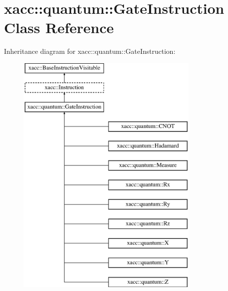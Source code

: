 \hypertarget{a00033}{}\section{xacc\+:\+:quantum\+:\+:Gate\+Instruction Class Reference}
\label{a00033}
Inheritance diagram for xacc\+:\+:quantum\+:\+:Gate\+Instruction\+:\begin{figure}[H]
\begin{center}
\leavevmode
\includegraphics[height=12.000000cm]{a00033}
\end{center}
\end{figure}
